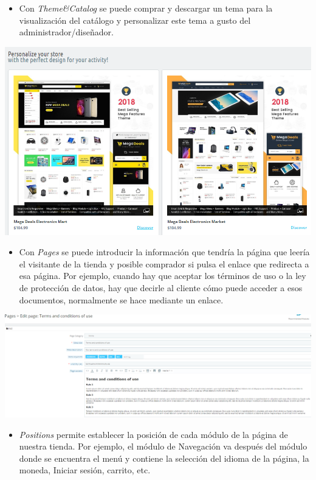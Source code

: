 \documentclass{article}
\begin{document}
\begin{itemize}
\item[\triangleright] Con \textit{Theme&Catalog} se puede comprar y descargar un tema para la visualización del catálogo y personalizar este tema a gusto del administrador/diseñador.
\end{itemize}

\begin{center}
\includegraphics[scale=0.4]{images/themecatalog.png}
\end{center}

\begin{itemize}
\item[\triangleright] Con \textit{Pages} se puede introducir la información que tendría la página que leería el visitante de la tienda y posible comprador si pulsa el enlace que redirecta a esa página. Por ejemplo, cuando hay que aceptar los términos de uso o la ley de protección de datos, hay que decirle al cliente cómo puede acceder a esos documentos, normalmente se hace mediante un enlace.
\end{itemize}

\begin{center}
\includegraphics[scale=0.25]{images/pages.png}
\end{center}

\begin{itemize}
\item[\triangleright] \textit{Positions} permite establecer la posición de cada módulo de la página de nuestra tienda. Por ejemplo, el módulo de Navegación va después del módulo donde se encuentra el menú y contiene la selección del idioma de la página, la moneda, Iniciar sesión, carrito, etc.
\end{itemize}
\end{document}
